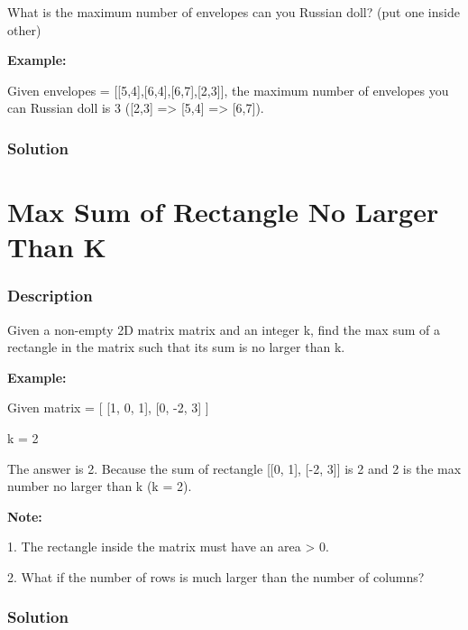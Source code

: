 What is the maximum number of envelopes can you Russian doll? (put one inside other)

\textbf{Example:}
\begin{Code}
Given envelopes = [[5,4],[6,4],[6,7],[2,3]], the maximum number of envelopes you can Russian doll is 3 ([2,3] => [5,4] => [6,7]).
\end{Code}

\subsubsection{Solution}

\begin{Code}

\end{Code}

\newpage

\section{Max Sum of Rectangle No Larger Than K} %

\subsubsection{Description}
Given a non-empty 2D matrix matrix and an integer k, find the max sum of a rectangle in the matrix such that its sum is no larger than k.

\textbf{Example:}
\begin{Code}
Given matrix = [
  [1,  0, 1],
  [0, -2, 3]
]
\end{Code}

k = 2

The answer is 2. Because the sum of rectangle [[0, 1], [-2, 3]] is 2 and 2 is the max number no larger than k (k = 2).

\textbf{Note:}

1. The rectangle inside the matrix must have an area > 0.

2. What if the number of rows is much larger than the number of columns?

\subsubsection{Solution}

\begin{Code}

\end{Code}

